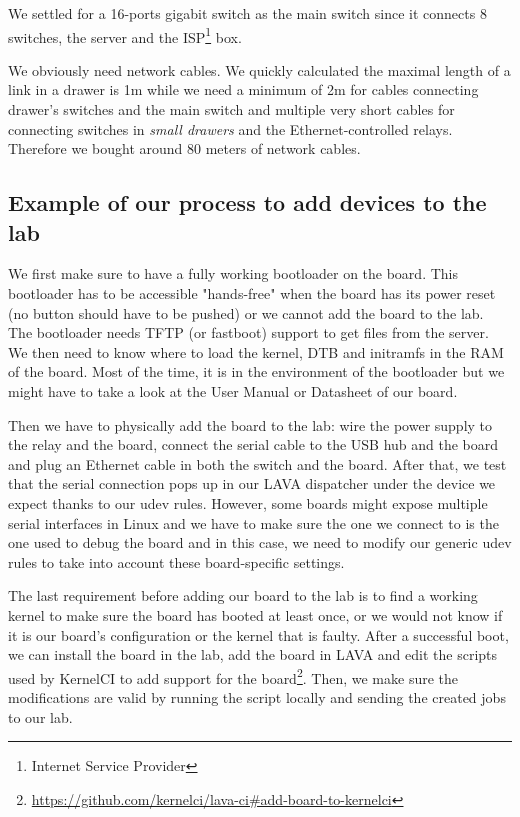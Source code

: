 We settled for a 16-ports gigabit switch as the main switch since it connects 8 switches, the server and the ISP\footnote{Internet Service Provider} box.

We obviously need network cables. We quickly calculated the maximal length of a link in a drawer is 1m while we need a minimum of 2m for cables connecting drawer's switches and the main switch and multiple very short cables for connecting switches in \textit{small drawers} and the Ethernet-controlled relays. Therefore we bought around 80 meters of network cables.

\subsection{Example of our process to add devices to the lab}

We first make sure to have a fully working bootloader on the board. This bootloader has to be accessible "hands-free" when the board has its power reset (no button should have to be pushed) or we cannot add the board to the lab. The bootloader needs TFTP (or fastboot) support to get files from the server. We then need to know where to load the kernel, DTB and initramfs in the RAM of the board. Most of the time, it is in the environment of the bootloader but we might have to take a look at the User Manual or Datasheet of our board.

Then we have to physically add the board to the lab: wire the power supply to the relay and the board, connect the serial cable to the USB hub and the board and plug an Ethernet cable in both the switch and the board. After that, we test that the serial connection pops up in our LAVA dispatcher under the device we expect thanks to our udev rules. However, some boards might expose multiple serial interfaces in Linux and we have to make sure the one we connect to is the one used to debug the board and in this case, we need to modify our generic udev rules to take into account these board-specific settings.

The last requirement before adding our board to the lab is to find a working kernel to make sure the board has booted at least once, or we would not know if it is our board's configuration or the kernel that is faulty. After a successful boot, we can install the board in the lab, add the board in LAVA and edit the scripts used by KernelCI to add support for the board\footnote{\url{https://github.com/kernelci/lava-ci\#add-board-to-kernelci}}. Then, we make sure the modifications are valid by running the script locally and sending the created jobs to our lab.

